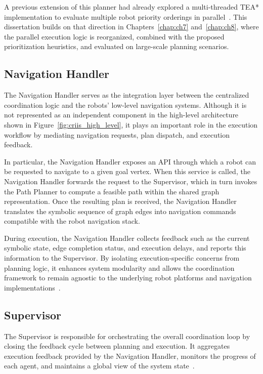 A previous extension of this planner had already explored a multi-threaded TEA* implementation
to evaluate multiple robot priority orderings in parallel~\cite{ribeiro2025parallel}. This
dissertation builds on that direction in Chapters~\ref{chap:ch7} and~\ref{chap:ch8}, where the
parallel execution logic is reorganized, combined with the proposed prioritization heuristics, and
evaluated on large-scale planning scenarios.

\subsection{Navigation Handler}
\label{subsec:navigation_handler}
\hspace{\parindent}
The Navigation Handler serves as the integration layer between the centralized coordination logic
and the robots' low-level navigation systems. Although it is not represented as an independent
component in the high-level architecture shown in Figure~\ref{fig:criis_high_level}, it plays an
important role in the execution workflow by mediating navigation requests, plan dispatch, and
execution feedback.

In particular, the Navigation Handler exposes an API through which a robot can be requested to
navigate to a given goal vertex. When this service is called, the Navigation Handler forwards the
request to the Supervisor, which in turn invokes the Path Planner to compute a feasible path within
the shared graph representation. Once the resulting plan is received, the Navigation Handler
translates the symbolic sequence of graph edges into navigation commands compatible with the
robot navigation stack.

During execution, the Navigation Handler collects feedback such as the current symbolic state,
edge completion status, and execution delays, and reports this information to the Supervisor. By
isolating execution-specific concerns from planning logic, it enhances system modularity and allows
the coordination framework to remain agnostic to the underlying robot platforms and navigation
implementations~\cite{matos2025criis}.

\subsection{Supervisor}
\label{subsec:supervisor}
\hspace{\parindent}
The Supervisor is responsible for orchestrating the overall coordination loop by closing the feedback
cycle between planning and execution. It aggregates execution feedback provided by the Navigation
Handler, monitors the progress of each agent, and maintains a global view of the system
state~\cite{matos2025criis}.

